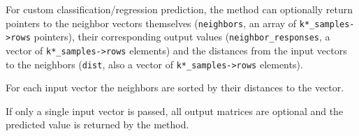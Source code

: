 For custom classification/regression prediction, the method can optionally return pointers to the neighbor vectors themselves (\texttt{neighbors}, an array of \texttt{k*\_samples->rows} pointers), their corresponding output values (\texttt{neighbor\_responses}, a vector of \texttt{k*\_samples->rows} elements) and the distances from the input vectors to the neighbors (\texttt{dist}, also a vector of \texttt{k*\_samples->rows} elements).

For each input vector the neighbors are sorted by their distances to the vector.

If only a single input vector is passed, all output matrices are optional and the predicted value is returned by the method.


